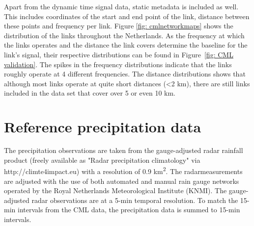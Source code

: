 \documentclass[twocolumn, 10pt, a4paper]{memoir}
\begin{document}
	Apart from the dynamic time signal data, static metadata is included as well. This includes coordinates of the start and end point of the link, distance between these points and frequency per link. Figure \ref{fig: cmlnetworkmaps} shows the distribution of the links throughout the Netherlands. As the frequency at which the links operates and the distance the link covers determine the baseline for the link's signal, their respective distributions can be found in Figure~\ref{fig: CML validation}. The spikes in the frequency distributions indicate that the links roughly operate at 4 different frequencies. The distance distributions shows that although most links operate at quite short distances (<2 km), there are still links included in the data set that cover over 5 or even 10 km.
	
	
	\section{Reference precipitation data} \label{sec: Ref prec data}
	The precipitation observations are taken from the gauge-adjusted radar rainfall product (freely available as "Radar precipitation climatology" via http://climte4impact.eu) with a resolution of 0.9 km\textsuperscript{2}. The radarmeasurements are adjusted with the use of both automated and manual rain gauge networks operated by the Royal Netherlands Meteorological Institute (KNMI). The gauge-adjusted radar observations are at a 5-min temporal resolution. To match the 15-min intervals from the CML data, the precipitation data is summed to 15-min intervals. 
	
	\openany
	\renewcommand{\bibname}{Bibliography}
	
	
	
	
	

	
	
	
	
\end{document}
